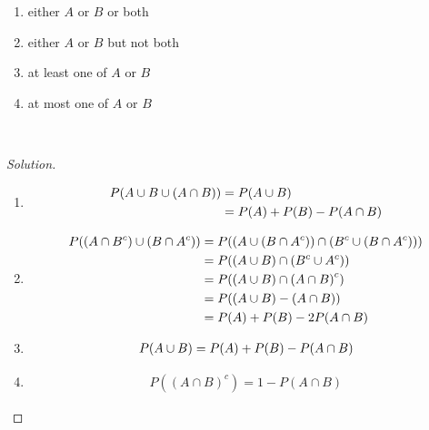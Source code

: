 \documentclass[12pt,letterpaper,reqno]{amsart}
\numberwithin{equation}{subsection}
\begin{document}
\begin{enumerate}[label=(\alph*),leftmargin=*]
    \item either $A$ or $B$ or both
    \item either $A$ or $B$ but not both
    \item at least one of $A$ or $B$
    \item at most one of $A$ or $B$
\end{enumerate}~\\

\begin{proof}[Solution]~\\

\begin{enumerate}[label=(\alph*),leftmargin=*]
    \item 
    
    \begin{align*}
        {P}\! \left( {A \cup B \cup (A \cap B)} \right) &= {P}\! \left( {A \cup B} \right) \\
                                          &= P(A) + P(B) - P(A \cap B)
    \end{align*}
    
    \item
    
    \begin{align*}
        \fun{P}{(A \cap B^c) \cup (B \cap A^c)} &= \fun{P}{ \left(A \cup (B \cap A^c) \right) \cap \left(B^c \cup (B \cap A^c) \right)} \\
        &= \fun{P}{\left(A \cup B \right) \cap \left(B^c \cup A^c \right)} \\
        &= \fun{P}{\left( A \cup B \right) \cap \left( A \cap B \right)^c} \\
        &= \fun{P}{\left( A \cup B \right) - \left( A \cap B \right)} \\
        &= \fun{P}{A} + \fun{P}{B} - 2\fun{P}{A \cap B}
    \end{align*}
    
    \item
    
    \begin{align*}
        {P}\! \left( {A \cup B} \right) = P(A) + P(B) - P(A \cap B)
    \end{align*}
    
    \item
    
    \begin{align*}
        P((A \cap B)^c) = 1 - P(A \cap B)
    \end{align*}
\end{enumerate}
\end{proof}
\end{document}
